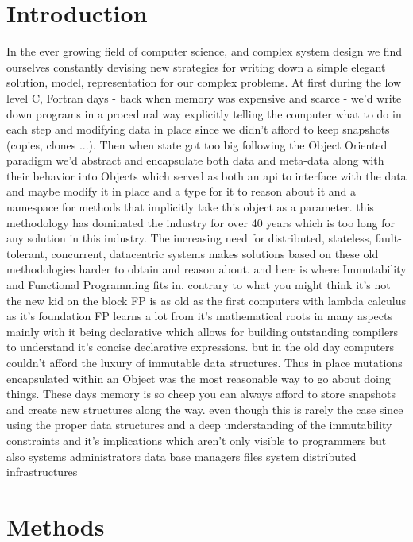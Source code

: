 \documentclass[conference]{IEEEtran}
\begin{document}
\section{Introduction}
In the ever growing field of computer science, and complex system design we find ourselves constantly devising new strategies for writing down a simple elegant solution, model, representation for our complex problems.
At first during the low level C, Fortran days - back when memory was expensive and scarce - we'd write down programs in a procedural way explicitly telling the computer what to do in each step and modifying data in place since we didn't afford to keep snapshots (copies, clones ...). \newline
Then when state got too big following the Object Oriented paradigm we'd abstract and encapsulate both data and meta-data along with their behavior into Objects which served as both an api to interface with the data and maybe modify it in place and a type for it to reason about it and a namespace for methods that implicitly take this object as a parameter.
this methodology has dominated the industry for over 40 years which is too long for any solution in this industry.
The increasing need for distributed, stateless, fault-tolerant, concurrent, datacentric systems makes solutions based on these old methodologies harder to obtain and reason about. and here is where Immutability and Functional Programming fits in.
contrary to what you might think it's not the new kid on the block FP is as old as the first computers with lambda calculus as it's foundation FP learns a lot from it's mathematical roots in many aspects mainly with it being declarative which allows for building outstanding compilers to understand it's concise declarative expressions. but in the old day computers couldn't afford the luxury of immutable data structures. Thus in place mutations encapsulated within an Object was the most reasonable way to go about doing things.\newline
These days memory is so cheep you can always afford to store snapshots and create new structures along the way. 
even though this is rarely the case since using the proper data structures and a deep understanding of the immutability constraints and it's implications which aren't only visible to programmers but also systems administrators data base managers files system distributed infrastructures

\section{Methods}
\end{document}
